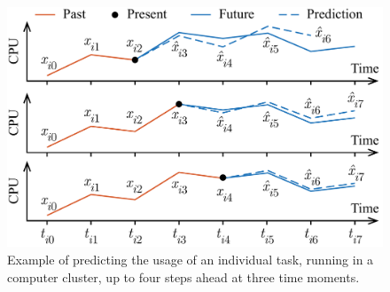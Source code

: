 \begin{figure}[b]
  \centering
  \vspace{-1.5em}
  \includegraphics[width=1.0\columnwidth]{include/assets/figures/example.pdf}
  \vspace{-1.5em}
  \caption{
    Example of predicting the  usage of an individual task, running in a
    computer cluster, up to four steps ahead at three time moments.
  }
\end{figure}
